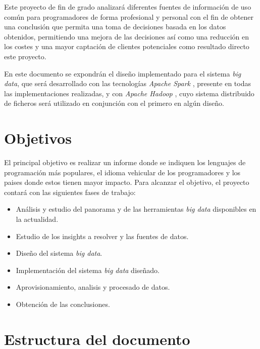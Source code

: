 Este proyecto de fin de grado analizará diferentes fuentes de información de uso común para programadores de forma profesional y personal con el fin de obtener una conclusión que permita una toma de decisiones basada en los datos obtenidos, permitiendo una mejora de las decisiones así como una reducción en los costes y una mayor captación de clientes potenciales como resultado directo este proyecto.

En este documento se expondrán el diseño implementado para el sistema \textit{big data}, que será desarrollado con las tecnologías \textit{Apache Spark} \cite{spark}, presente en todas las implementaciones realizadas, y con \textit{Apache Hadoop} \cite{hadoop}, cuyo sistema distribuido de ficheros será utilizado en conjunción con el primero en algún diseño.




\section{Objetivos}

El principal objetivo es realizar un informe donde se indiquen los lenguajes de programación más populares, el idioma vehicular de los programadores y los paises donde estos tienen mayor impacto. Para alcanzar el objetivo, el proyecto contará con las siguientes fases de trabajo:

\begin{itemize}
	\item Análisis y estudio del panorama y de las herramientas \textit{big data} disponibles en la actualidad.
	
	\item Estudio de los insights a resolver y las fuentes de datos.
	
	\item Diseño del sistema \textit{big data}.
	
	\item Implementación del sistema \textit{big data} diseñado.
	
	\item Aprovisionamiento, analisis y procesado de datos.
	
	\item Obtención de las conclusiones. 
\end{itemize}

\clearpage
\section{Estructura del documento}

